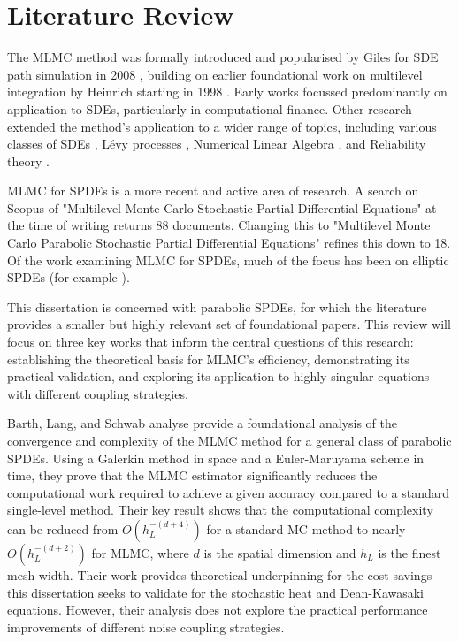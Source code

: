 \section{Literature Review}

The MLMC method was formally introduced and popularised by 
Giles for SDE path simulation in 2008 \cite{giles2008multilevel}, 
building on earlier foundational work on multilevel integration by 
Heinrich starting in 1998 \cite{heinrich1998monte}. Early works focussed 
predominantly on application to SDEs, particularly in computational 
finance. Other research extended the method's application to a wider range 
of topics, including various classes of SDEs \cite{abdulle2013stabilized,
rhee2015unbiased}, Lévy processes \cite{giles2017multilevel}, 
Numerical Linear Algebra \cite{acebron2020probabilistic},
and Reliability theory \cite{aslett2017multilevel}.

MLMC for SPDEs is a more recent and active area of research. 
A search on Scopus \cite{scopus} of "Multilevel Monte Carlo Stochastic
Partial Differential Equations" at the time of writing returns 88 documents. Changing 
this to "Multilevel Monte Carlo Parabolic Stochastic Partial Differential Equations" refines 
this down to 18. Of the work examining MLMC for SPDEs, much of the focus has been on 
elliptic SPDEs (for example \cite{abdulle2013multilevel, kornhuber2014multilevel, luo2019multilevel}).

This dissertation is concerned with parabolic SPDEs, for which the literature 
provides a smaller but highly relevant set of foundational papers. This review will focus on 
three key works that inform the central questions of this research: establishing the theoretical 
basis for MLMC's efficiency, demonstrating its practical validation, and exploring 
its application to highly singular equations with different coupling strategies. 


Barth, Lang, and Schwab \cite{barth2013multilevel} analyse provide a foundational 
analysis of the convergence and complexity of the MLMC method for a general class of 
parabolic SPDEs. Using a Galerkin method in space and a Euler-Maruyama scheme in time, they 
prove that the  MLMC estimator significantly reduces the computational work required 
to achieve a given accuracy compared to a standard single-level method. Their 
key result shows that the computational complexity can be reduced from $O(h_L^{-(d+4)})$
for a standard MC method to nearly $O(h_L^{-(d+2)})$ for MLMC, where $d$ is the 
spatial dimension and $h_L$ is the finest mesh width. Their work provides 
theoretical underpinning for the cost savings this dissertation seeks to validate for 
the stochastic heat and Dean-Kawasaki equations. However, their analysis does not explore
the practical performance improvements of different noise coupling strategies.


